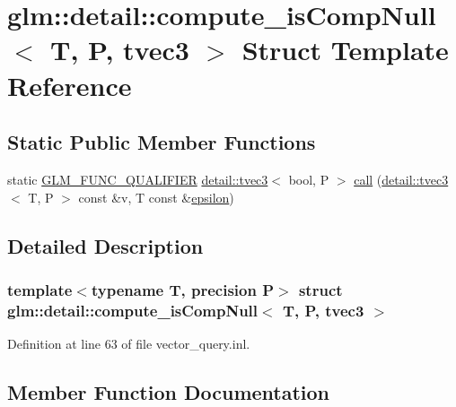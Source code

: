 \hypertarget{structglm_1_1detail_1_1compute__is_comp_null_3_01_t_00_01_p_00_01tvec3_01_4}{}\section{glm\+:\+:detail\+:\+:compute\+\_\+is\+Comp\+Null$<$ T, P, tvec3 $>$ Struct Template Reference}
\label{structglm_1_1detail_1_1compute__is_comp_null_3_01_t_00_01_p_00_01tvec3_01_4}
\subsection*{Static Public Member Functions}
\begin{DoxyCompactItemize}
\item 
static \hyperlink{setup_8hpp_a33fdea6f91c5f834105f7415e2a64407}{G\+L\+M\+\_\+\+F\+U\+N\+C\+\_\+\+Q\+U\+A\+L\+I\+F\+I\+ER} \hyperlink{structglm_1_1detail_1_1tvec3}{detail\+::tvec3}$<$ bool, P $>$ \hyperlink{structglm_1_1detail_1_1compute__is_comp_null_3_01_t_00_01_p_00_01tvec3_01_4_a0a45c3ab9debff20dae1f53392500840}{call} (\hyperlink{structglm_1_1detail_1_1tvec3}{detail\+::tvec3}$<$ T, P $>$ const \&v, T const \&\hyperlink{group__gtc__constants_gacb41049b8d22c8aa90e362b96c524feb}{epsilon})
\end{DoxyCompactItemize}


\subsection{Detailed Description}
\subsubsection*{template$<$typename T, precision P$>$\newline
struct glm\+::detail\+::compute\+\_\+is\+Comp\+Null$<$ T, P, tvec3 $>$}



Definition at line 63 of file vector\+\_\+query.\+inl.



\subsection{Member Function Documentation}
\mbox{\label{structglm_1_1detail_1_1compute__is_comp_null_3_01_t_00_01_p_00_01tvec3_01_4_a0a45c3ab9debff20dae1f53392500840}} 
